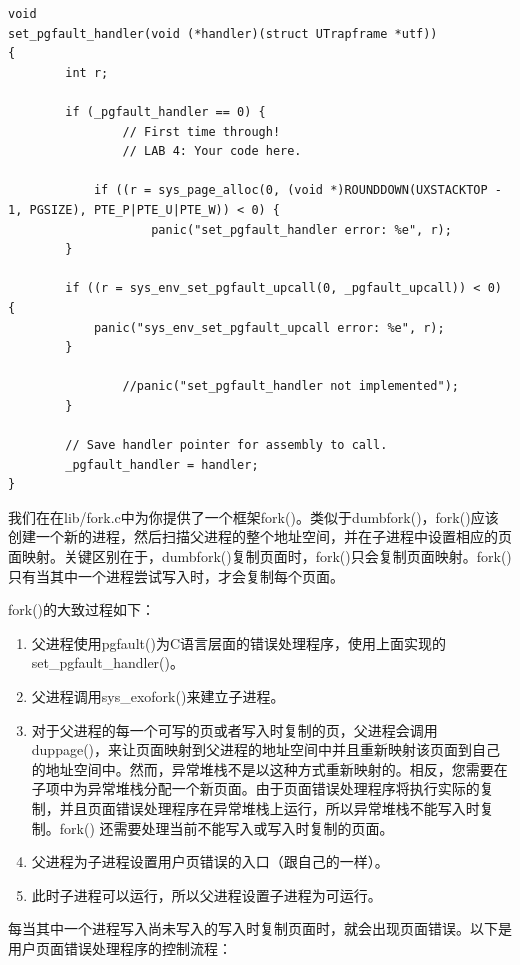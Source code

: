 \begin{ExerciseList}

\begin{verbatim}
void
set_pgfault_handler(void (*handler)(struct UTrapframe *utf))
{
        int r;

        if (_pgfault_handler == 0) {
                // First time through!
                // LAB 4: Your code here.

            if ((r = sys_page_alloc(0, (void *)ROUNDDOWN(UXSTACKTOP - 1, PGSIZE), PTE_P|PTE_U|PTE_W)) < 0) {
                    panic("set_pgfault_handler error: %e", r);
        }

        if ((r = sys_env_set_pgfault_upcall(0, _pgfault_upcall)) < 0) {
            panic("sys_env_set_pgfault_upcall error: %e", r);
        }

                //panic("set_pgfault_handler not implemented");
        }

        // Save handler pointer for assembly to call.
        _pgfault_handler = handler;
}
\end{verbatim}

我们在在lib/fork.c中为你提供了一个框架fork()。类似于dumbfork()，fork()应该创建一个新的进程，然后扫描父进程的整个地址空间，并在子进程中设置相应的页面映射。关键区别在于，dumbfork()复制页面时，fork()只会复制页面映射。fork()只有当其中一个进程尝试写入时，才会复制每个页面。

fork()的大致过程如下：
\begin{enumerate}
\item 父进程使用pgfault()为C语言层面的错误处理程序，使用上面实现的set\_pgfault\_handler()。
\item 父进程调用sys\_exofork()来建立子进程。
\item 对于父进程的每一个可写的页或者写入时复制的页，父进程会调用duppage()，来让页面映射到父进程的地址空间中并且重新映射该页面到自己的地址空间中。然而，异常堆栈不是以这种方式重新映射的。相反，您需要在子项中为异常堆栈分配一个新页面。由于页面错误处理程序将执行实际的复制，并且页面错误处理程序在异常堆栈上运行，所以异常堆栈不能写入时复制。fork() 还需要处理当前不能写入或写入时复制的页面。
\item 父进程为子进程设置用户页错误的入口（跟自己的一样）。
\item 此时子进程可以运行，所以父进程设置子进程为可运行。
\end{enumerate}

每当其中一个进程写入尚未写入的写入时复制页面时，就会出现页面错误。以下是用户页面错误处理程序的控制流程：


\end{ExerciseList}
